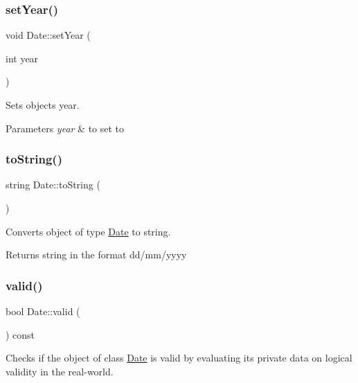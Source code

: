 \subsubsection{\texorpdfstring{set\+Year()}{setYear()}}
{\footnotesize\ttfamily void Date\+::set\+Year (\begin{DoxyParamCaption}\item[{int}]{year }\end{DoxyParamCaption})}



Sets object\textquotesingle{}s year. 


\begin{DoxyParams}{Parameters}
{\em year} & to set to \\
\hline
\end{DoxyParams}
\mbox{\label{group___date_gadebdb45904dc2fbfacc66aa7528e0c04}} 
\subsubsection{\texorpdfstring{to\+String()}{toString()}}
{\footnotesize\ttfamily string Date\+::to\+String (\begin{DoxyParamCaption}{ }\end{DoxyParamCaption})}



Converts object of type \hyperlink{class_date}{Date} to string. 

\begin{DoxyReturn}{Returns}
string in the format dd/mm/yyyy 
\end{DoxyReturn}
\mbox{\label{group___date_gac7a8c7b77f99b162a931199464c1bedc}} 
\subsubsection{\texorpdfstring{valid()}{valid()}}
{\footnotesize\ttfamily bool Date\+::valid (\begin{DoxyParamCaption}{ }\end{DoxyParamCaption}) const}



Checks if the object of class \hyperlink{class_date}{Date} is valid by evaluating it\textquotesingle{}s private data on logical validity in the real-\/world. 


